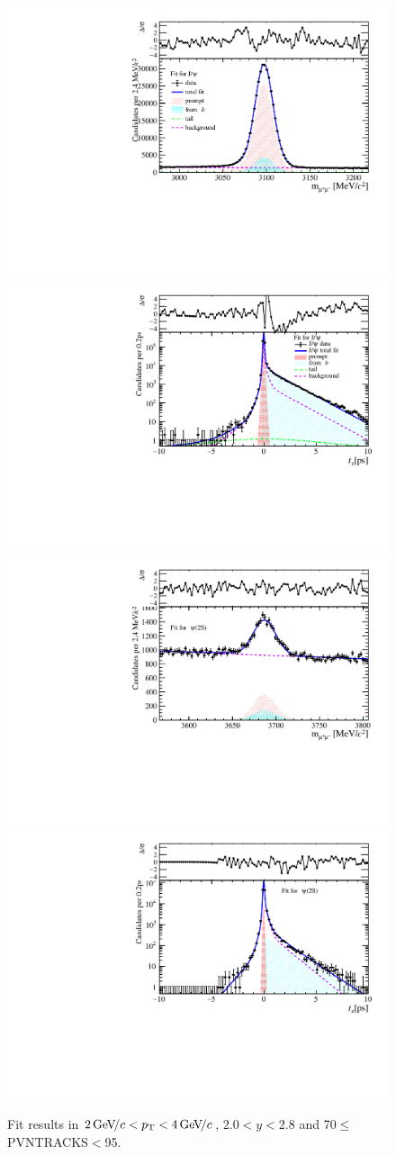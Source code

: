 \begin{figure}[H]
\begin{center}
\includegraphics[width=0.47\linewidth]{pdf/Jpsi/drawmass/n4y1pt2.pdf}
\includegraphics[width=0.47\linewidth]{pdf/Jpsi/2DFit/n4y1pt2.pdf}
\vspace*{-0.5cm}
\includegraphics[width=0.47\linewidth]{pdf/Psi2S/drawmass/n4y1pt2.pdf}
\includegraphics[width=0.47\linewidth]{pdf/Psi2S/2DFit/n4y1pt2.pdf}
\vspace*{-0.5cm}
\end{center}
\caption{Fit results in $2\text{\,Ge\kern -0.1em V\!/}c<p_{\mathrm{T}}<4\text{\,Ge\kern -0.1em V\!/}c$, $2.0<y<2.8$ and 70$\leq$PVNTRACKS$<$95.}
\label{Fitn4y1pt2}
\end{figure}
